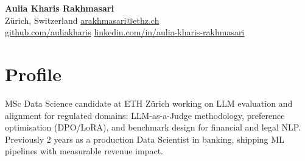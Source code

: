 \documentclass[10.5pt,a4paper]{article}
\begin{document}

\begin{center}
  {\LARGE\bfseries\color{accent} Aulia Kharis Rakhmasari}\\[0.35em]
  {\small
    Zürich, Switzerland  \quad\textbar\quad
    \href{mailto:arakhmasari@ethz.ch}{arakhmasari@ethz.ch}\\[0.2em]
    \href{https://github.com/auliakharis}{github.com/auliakharis} \quad\textbar\quad
    \href{https://www.linkedin.com/in/aulia-kharis-rakhmasari/}{linkedin.com/in/aulia-kharis-rakhmasari}
  }
\end{center}
\vspace{-0.3em}

\section{Profile}
MSc Data Science candidate at ETH Zürich working on LLM evaluation and alignment for regulated
domains: LLM-as-a-Judge methodology, preference optimisation (DPO/LoRA), and benchmark design for
financial and legal NLP. Previously 2 years as a production Data Scientist in banking,
shipping ML pipelines with measurable revenue impact.

\end{document}

